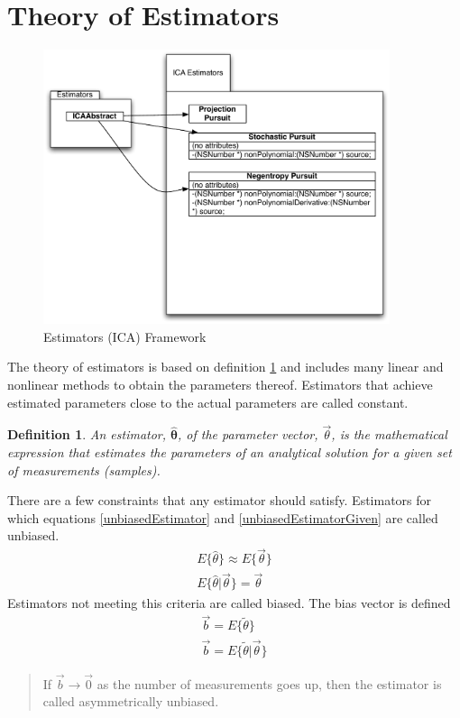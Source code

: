 \documentclass[12pt ]{article}
\newtheorem{adef}[thm]{Definition}
\begin{document}
\section{Theory of Estimators}
\begin{figure}[htbp] %
   \centering
   \includegraphics[width=4in]{estimators.pdf} 
   \caption{Estimators (ICA) Framework}
   \label{fig-estimator-world}
\end{figure}
The theory of estimators is based on definition \ref{estimatorDefinition} and includes many linear and nonlinear methods to obtain the parameters thereof.   Estimators that achieve estimated parameters close to the actual parameters are called constant.  
	\begin{adef}
		\label{estimatorDefinition}
	An estimator, $\hat{\mathbf{\theta}}$, of the parameter vector, $\vec{\theta}$, is the mathematical expression that estimates the parameters of an analytical solution for a given set of measurements (samples).
	\end{adef}

There are a few constraints that any estimator should satisfy.   Estimators for which equations \ref{unbiasedEstimator} and \ref{unbiasedEstimatorGiven} are called unbiased.  
\begin{eqnarray}
E \{ \hat{\theta} \} \approx E \{\vec{\theta} \} \label{unbiasedEstimator}\\
E \{ \hat{\theta} | \vec{\theta} \} = \vec{\theta} \label{unbiasedEstimatorGiven}
\end{eqnarray}
Estimators not meeting this criteria are called biased.  The bias vector is defined 
\begin{eqnarray}
\vec{b} = E \{ \tilde {\theta} \} \\
\vec{b} = E \{ \tilde {\theta} | \vec{\theta} \} 
\end{eqnarray}
\begin{quote}
If $\vec{b} \to \vec{0}$ as the number of measurements goes up, then the estimator is called asymmetrically unbiased.
\cite[79]{appo-ica-book}
\end{quote}
\end{document}
